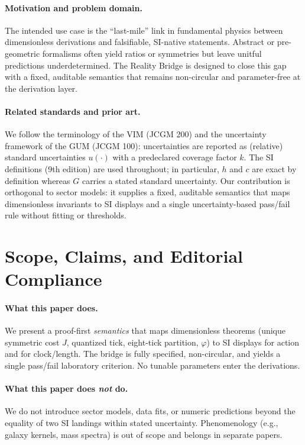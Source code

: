 \documentclass[11pt]{article}
\theoremstyle{plain}
\theoremstyle{definition}
\theoremstyle{remark}
\begin{document}
\paragraph{Motivation and problem domain.}
The intended use case is the “last-mile” link in fundamental physics between dimensionless derivations and falsifiable, SI-native statements. Abstract or pre-geometric formalisms often yield ratios or symmetries but leave unitful predictions underdetermined. The Reality Bridge is designed to close this gap with a fixed, auditable semantics that remains non-circular and parameter-free at the derivation layer.

\paragraph{Related standards and prior art.}
We follow the terminology of the VIM (JCGM 200) and the uncertainty framework of the GUM (JCGM 100): uncertainties are reported as (relative) standard uncertainties \(u(\cdot)\) with a predeclared coverage factor \(k\). The SI definitions (9th edition) are used throughout; in particular, \(h\) and \(c\) are exact by definition whereas \(G\) carries a stated standard uncertainty. Our contribution is orthogonal to sector models: it supplies a fixed, auditable semantics that maps dimensionless invariants to SI displays and a single uncertainty-based pass/fail rule without fitting or thresholds.

\section{Scope, Claims, and Editorial Compliance}

\paragraph{What this paper does.}
We present a proof-first \emph{semantics} that maps dimensionless theorems (unique symmetric cost \(J\), quantized tick, eight-tick partition, \(\varphi\)) to SI displays for action and for clock/length. The bridge is fully specified, non-circular, and yields a single pass/fail laboratory criterion. No tunable parameters enter the derivations.

\paragraph{What this paper does \emph{not} do.}
We do not introduce sector models, data fits, or numeric predictions beyond the equality of two SI landings within stated uncertainty. Phenomenology (e.g., galaxy kernels, mass spectra) is out of scope and belongs in separate papers.
\end{document}
